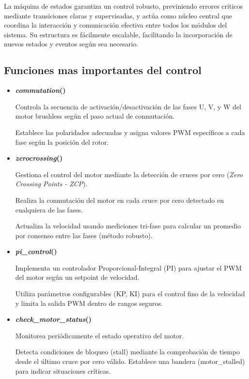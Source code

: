 La máquina de estados garantiza un control robusto, previniendo errores críticos mediante transiciones claras y supervisadas, y actúa como núcleo central que coordina la interacción y comunicación efectiva entre todos los módulos del sistema. Su estructura es fácilmente escalable, facilitando la incorporación de nuevos estados y eventos según sea necesario.

\subsection{Funciones mas importantes del control}
\begin{itemize}

\item \textbf{\textit{commutation}()} \par
Controla la secuencia de activación/desactivación de las fases U, V, y W del motor brushless según el paso actual de conmutación.

Establece las polaridades adecuadas y asigna valores PWM específicos a cada fase según la posición del rotor.

\item \textbf{\textit{zero\text{\_}crossing}()} \par
Gestiona el control del motor mediante la detección de cruces por cero (\textit{Zero Crossing Points - ZCP}).

Realiza la conmutación del motor en cada cruce por cero detectado en cualquiera de las fases.

Actualiza la velocidad usando mediciones tri-fase para calcular un promedio por consenso entre las fases (método robusto).

\item \textbf{\textit{pi\_control}()} \par
Implementa un controlador Proporcional-Integral (PI) para ajustar el PWM del motor según un setpoint de velocidad.

Utiliza parámetros configurables (KP, KI) para el control fino de la velocidad y limita la salida PWM dentro de rangos seguros.


\item \textbf{\textit{check\_motor\_status}()} \par
Monitorea periódicamente el estado operativo del motor.

Detecta condiciones de bloqueo (stall) mediante la comprobación de tiempo desde el último cruce por cero válido.
Establece una bandera (motor\_stalled) para indicar situaciones críticas.


\end{itemize}
